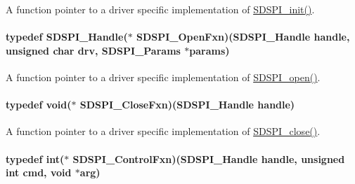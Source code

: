 A function pointer to a driver specific implementation of \hyperlink{_s_d_s_p_i_8h_a83cfcebe7875d9d8b5e08e57e6785ae6}{S\-D\-S\-P\-I\-\_\-init()}. 

\paragraph[{S\-D\-S\-P\-I\-\_\-\-Open\-Fxn}]{\setlength{\rightskip}{0pt plus 5cm}typedef {\bf S\-D\-S\-P\-I\-\_\-\-Handle}($\ast$ S\-D\-S\-P\-I\-\_\-\-Open\-Fxn)({\bf S\-D\-S\-P\-I\-\_\-\-Handle} handle, unsigned char drv, {\bf S\-D\-S\-P\-I\-\_\-\-Params} $\ast$params)}\label{_s_d_s_p_i_8h_a2ff79d0b69515e8da6ad65367239236b}


A function pointer to a driver specific implementation of \hyperlink{_s_d_s_p_i_8h_af4a5ca9bb35e8a7df02acf20ceeae66d}{S\-D\-S\-P\-I\-\_\-open()}. 

\paragraph[{S\-D\-S\-P\-I\-\_\-\-Close\-Fxn}]{\setlength{\rightskip}{0pt plus 5cm}typedef void($\ast$ S\-D\-S\-P\-I\-\_\-\-Close\-Fxn)({\bf S\-D\-S\-P\-I\-\_\-\-Handle} handle)}\label{_s_d_s_p_i_8h_a81531f5ec9d2e1b167e3c21edc1636cb}


A function pointer to a driver specific implementation of \hyperlink{_s_d_s_p_i_8h_a8816c223935b575f10acd5277b9a8ca5}{S\-D\-S\-P\-I\-\_\-close()}. 

\paragraph[{S\-D\-S\-P\-I\-\_\-\-Control\-Fxn}]{\setlength{\rightskip}{0pt plus 5cm}typedef int($\ast$ S\-D\-S\-P\-I\-\_\-\-Control\-Fxn)({\bf S\-D\-S\-P\-I\-\_\-\-Handle} handle, unsigned int cmd, void $\ast$arg)}\label{_s_d_s_p_i_8h_ad4f4fea0465def77622c20abb3519c6c}


